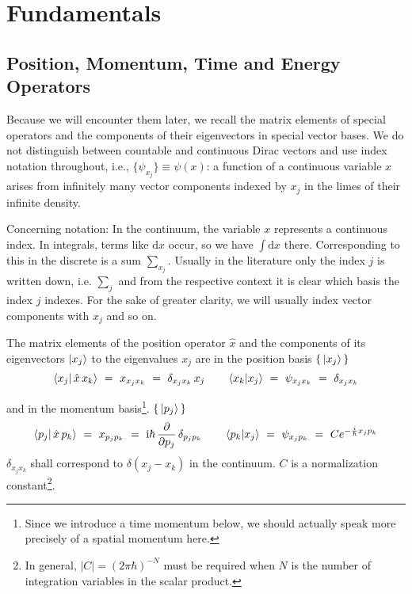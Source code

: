 \documentclass[12pt]{article}
\begin{document}
\section{Fundamentals}

\subsection{Position, Momentum, Time and Energy Operators}

Because we will encounter them later, we recall the matrix elements of special operators and the components of their eigenvectors in special vector bases. We do not distinguish between countable and continuous Dirac vectors and use index notation throughout, i.e., $\{\psi_{x_j}\} \equiv \psi(x)$: a function of a continuous variable $x$ arises from infinitely many vector components indexed by $x_j$ in the limes of their infinite density.

Concerning notation: In the continuum, the variable $x$ represents a continuous index. In integrals, terms like $\mathrm{d}x$ occur, so we have $\int\mathrm{d}x$ there. Corresponding to this in the discrete is a sum $\sum_{x_j}$. Usually in the literature only the index $j$ is written down, i.e. $\sum_j$ and from the respective context it is clear which basis the index $j$ indexes. For the sake of greater clarity, we will usually index vector components with $x_j$ and so on.

The matrix elements of the position operator $\hat{x}$ and the components of its eigenvectors $\ket{x_j}$ to the eigenvalues $x_j$ are in the position basis $\{\,\ket{x_j}\,\}$
\begin{equation}
\bra{x_j}\ket{\,\hat{x}\,x_k}\ =\ x_{x_j x_k}\ =\ \delta_{x_j x_k}\,x_j
\quad\quad 
\bra{x_k}\ket{x_j}\ =\ \psi_{x_j x_k}\ =\ \delta_{x_j x_k}
\end{equation}

and in the momentum basis\footnote{Since we introduce a time momentum below, we should actually speak more precisely of a spatial momentum here.}. $\{\,\ket{p_j}\,\}$
\begin{equation}
\label{eq:space_components}
\bra{p_j}\ket{\,\hat{x}\,p_k}\ =\ x_{p_j p_k}\ =\ 
\mathrm{i}\hbar\,\frac{\partial}{\partial p_j}\,\delta_{p_j p_k}
\quad\quad 
\bra{p_k}\ket{x_j}\ =\ \psi_{x_j p_k}\ =\ C e^{-\frac{i}{\hbar}x_j p_k}
\end{equation}
$\delta_{x_j x_k}$ shall correspond to $\delta(x_j - x_k)$ in the continuum. $C$ is a normalization constant\footnote{In general, $|C|=(2\pi\hbar)^{-N}$ must be required when $N$ is the number of integration variables in the scalar product.}.
\end{document}
